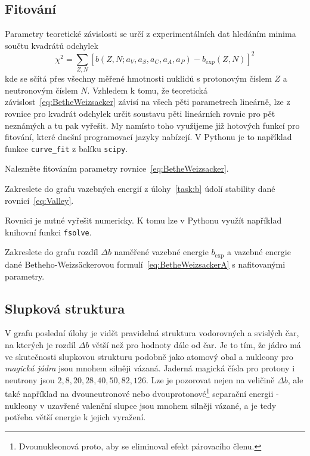 \documentclass[a4paper,12pt,oneside]{article}
\def\code#1{\textnormal{\texttt{#1}}}
\theoremstyle{red}
\begin{document}
    \subsection{Fitování}
        Parametry teoretické závislosti se určí z experimentálních dat hledáním minima součtu kvadrátů odchylek
        \begin{equation}
            \chi^{2}=\sum_{Z,N}\left[b(Z,N;a_{V},a_{S},a_{C},a_{A},a_{P})-b_{\mathrm{exp}}(Z,N)\right]^{2}
        \end{equation}
        kde se sčítá přes všechny měřené hmotnosti nuklidů s protonovým číslem $Z$ a neutronovým číslem $N$.
        Vzhledem k tomu, že teoretická závislost~\eqref{eq:BetheWeizsacker} závisí na všech pěti parametrech lineárně, lze z rovnice pro kvadrát odchylek určit soustavu pěti lineárních rovnic pro pět neznámých a tu pak vyřešit.
        My namísto toho využijeme již hotových funkcí pro fitování, které dnešní programovací jazyky nabízejí.
        V Pythonu je to například funkce \code{curve\_fit} z balíku \code{scipy}.

        \begin{task}
            Nalezněte fitováním parametry rovnice~\eqref{eq:BetheWeizsacker}.
        \end{task}

        \begin{task}
            Zakreslete do grafu vazebných energií z úlohy~\ref{task:b} údolí stability dané rovnicí~\eqref{eq:Valley}.
        \end{task}
        Rovnici je nutné vyřešit numericky.
        K tomu lze v Pythonu využít například knihovní funkci \code{fsolve}.

        \begin{task}
            Zakreslete do grafu rozdíl $\Delta b$ naměřené vazebné energie $b_{\mathrm{exp}}$ a vazebné energie dané Betheho-Weizsäckerovou formulí~\eqref{eq:BetheWeizsackerA} s nafitovanými parametry.
        \end{task}

    \subsection{Slupková struktura}
        V grafu poslední úlohy je vidět pravidelná struktura vodorovných a svislých čar, na kterých je rozdíl $\Delta b$ větší než pro hodnoty dále od čar.
        Je to tím, že jádro má ve skutečnosti slupkovou strukturu podobně jako atomový obal a nukleony pro \emph{magická jádra} jsou mnohem silněji vázaná.
        Jaderná magická čísla pro protony i neutrony jsou $2,8,20,28,40,50,82,126$.
        Lze je pozorovat nejen na veličině $\Delta b$, ale také například na dvouneutronové nebo dvouprotonové\footnote{Dvounukleonová proto, aby se eliminoval efekt párovacího členu.} separační energii - nukleony v uzavřené valenční slupce jsou mnohem silněji vázané, a je tedy potřeba větší energie k jejich vyražení.
\end{document}
